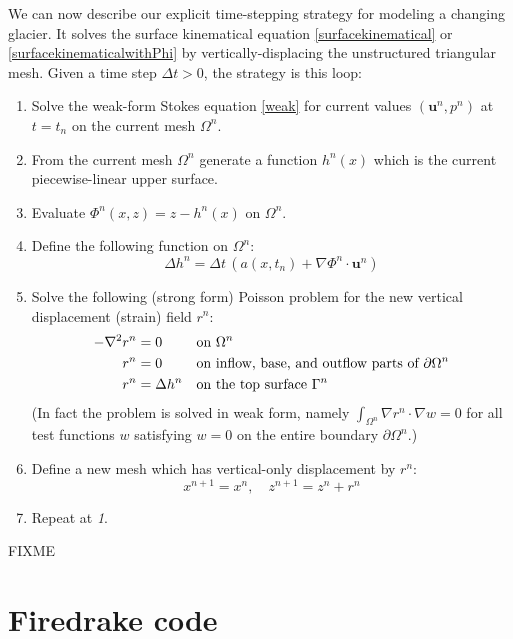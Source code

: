 \documentclass[letterpaper,final,12pt,reqno]{amsart}
\newcommand{\grad}{\nabla}
\newcommand{\bu}{\mathbf{u}}
\begin{document}
We can now describe our explicit time-stepping strategy for modeling a changing glacier.  It solves the surface kinematical equation \eqref{surfacekinematical} or \eqref{surfacekinematicalwithPhi} by vertically-displacing the unstructured triangular mesh.  Given a time step $\Delta t > 0$, the strategy is this loop:
\renewcommand{\labelenumi}{\emph{\arabic{enumi}.}}
\begin{enumerate}
\item Solve the weak-form Stokes equation \eqref{weak} for current values $(\bu^n,p^n)$ at $t=t_n$ on the current mesh $\Omega^n$.
\item From the current mesh $\Omega^n$ generate a function $h^n(x)$ which is the current piecewise-linear upper surface.
\item Evaluate $\Phi^n(x,z) = z - h^n(x)$ on $\Omega^n$.
\item Define the following function on $\Omega^n$:
\begin{equation}
\Delta h^n =  \Delta t\,\left(a(x,t_n) + \grad \Phi^n\cdot \bu^n\right) \label{deltahfield}
\end{equation}
\item Solve the following (strong form) Poisson problem for the new vertical displacement (strain) field $r^n$:
\begin{align}
- \grad^2 r^n &= 0 & &\text{on } \Omega^n \\
          r^n &= 0 & &\text{on inflow, base, and outflow parts of } \partial \Omega^n \notag \\
          r^n &= \Delta h^n & &\text{on the top surface } \Gamma^n \notag
\end{align}
(In fact the problem is solved in weak form, namely $\int_{\Omega^n} \grad r^n\cdot \grad w = 0$ for all test functions $w$ satisfying $w=0$ on the entire boundary $\partial \Omega^n$.)
\item Define a new mesh which has vertical-only displacement by $r^n$:
\begin{equation}
  x^{n+1} = x^n, \quad z^{n+1} = z^n + r^n \label{updatemesh}
\end{equation}
\item Repeat at \emph{1}.
\end{enumerate}

FIXME

\section{Firedrake code}
\end{document}

